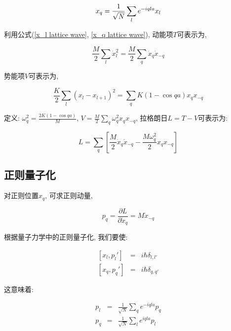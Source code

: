 \begin{equation}\label{x_q lattice wave}
  x_q = \frac{1}{\sqrt N} \sum_l e^{-i q l a} x_l \\
\end{equation}

利用公式(\ref{x_l lattice wave}, \ref{x_q lattice wave}),
动能项$T$可表示为,

\begin{equation*}
\frac{M}{2}\sum_l \dot x_l^2 = \frac{M}{2} \sum_q \dot x_q \dot
x_{-q}
\end{equation*}

势能项$V$可表示为,

\begin{equation*}
\frac{K}{2} \sum_l (x_l -x_{l+1})^2 =  \sum_q K(1- \cos q a) x_q
x_{-q}
\end{equation*}

定义: $\omega_q^2 = \frac{2K(1-\cos qa)}{M} $, $V = \frac{M}{2}
\sum_q \omega_q^2 x_q x_{-q} $, 拉格朗日$L=T-V$可表示为:

\begin{equation*}
L = \sum_q \left[ \frac{M}{2} \dot x_q \dot x_{-q} - \frac{M
\omega_q^2}{2} x_q x_{-q} \right]
\end{equation*}

\subsection{正则量子化}

对正则位置$x_q$, 可求正则动量,

\begin{equation*}
p_q = \frac{\partial L}{\partial \dot x_q} = M \dot x_{-q}
\end{equation*}

根据量子力学中的正则量子化, 我们要使:

\begin{eqnarray*}
\left[ x_l  ,  p_l' \right] &=& i \hbar \delta_{l,l'} \\
\left[ x_q  ,  p_q' \right] &=& i \hbar \delta_{q,q'}
\end{eqnarray*}

这意味着:

\begin{eqnarray*}
  p_l &=& \frac{1}{\sqrt N} \sum_q e^{-i q l a } p_q \\
  p_q &=& \frac{1}{\sqrt N} \sum_l e^{i q l a} p_l
\end{eqnarray*}



